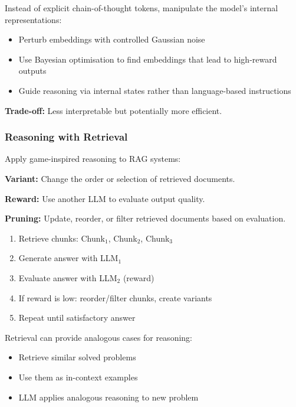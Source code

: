 \begin{defbox}
Instead of explicit chain-of-thought tokens, manipulate the model's internal representations:
\begin{itemize}
  \item Perturb embeddings with controlled Gaussian noise
  \item Use Bayesian optimisation to find embeddings that lead to high-reward outputs
  \item Guide reasoning via internal states rather than language-based instructions
\end{itemize}

\textbf{Trade-off:} Less interpretable but potentially more efficient.
\end{defbox}

\bigseparator

\subsubsection{Reasoning with Retrieval}

\begin{defbox}
Apply game-inspired reasoning to RAG systems:

\textbf{Variant:} Change the order or selection of retrieved documents.

\textbf{Reward:} Use another LLM to evaluate output quality.

\textbf{Pruning:} Update, reorder, or filter retrieved documents based on evaluation.
\end{defbox}

\begin{exbox}
\begin{enumerate}
  \item Retrieve chunks: Chunk$_1$, Chunk$_2$, Chunk$_3$
  \item Generate answer with LLM$_1$
  \item Evaluate answer with LLM$_2$ (reward)
  \item If reward is low: reorder/filter chunks, create variants
  \item Repeat until satisfactory answer
\end{enumerate}
\end{exbox}

\begin{tipbox}
Retrieval can provide analogous cases for reasoning:
\begin{itemize}
  \item Retrieve similar solved problems
  \item Use them as in-context examples
  \item LLM applies analogous reasoning to new problem
\end{itemize}
\end{tipbox}

